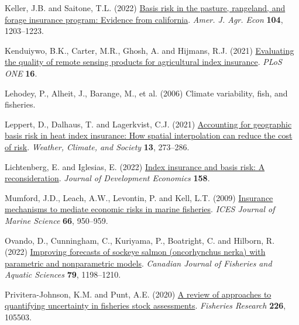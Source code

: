 \documentclass[
  letterpaper,
  DIV=11,
  numbers=noendperiod]{scrartcl}
\newlength{\cslhangindent}
\newlength{\cslentryspacingunit} %
\newenvironment{CSLReferences}[2] %
 {%
  \setlength{\parindent}{0pt}
  \ifodd #1
  \let\oldpar\par
  \def\par{\hangindent=\cslhangindent\oldpar}
  \fi
  \setlength{\parskip}{#2\cslentryspacingunit}
 }%
 {}
\begin{document}
\begin{CSLReferences}{1}{0}
\leavevmode{}%
Keller, J.B. and Saitone, T.L. (2022)
\href{https://doi.org/10.1111/ajae.12282}{Basis risk in the pasture,
rangeland, and forage insurance program: Evidence from california}.
\emph{Amer. J. Agr. Econ} \textbf{104}, 1203--1223.

\leavevmode{}%
Kenduiywo, B.K., Carter, M.R., Ghosh, A. and Hijmans, R.J. (2021)
\href{https://doi.org/10.1371/journal.pone.0258215}{Evaluating the
quality of remote sensing products for agricultural index insurance}.
\emph{PLoS ONE} \textbf{16}.

\leavevmode{}%
Lehodey, P., Alheit, J., Barange, M., et al. (2006) Climate variability,
fish, and fisheries.

\leavevmode{}%
Leppert, D., Dalhaus, T. and Lagerkvist, C.J. (2021)
\href{https://doi.org/10.1175/WCAS-D-20-0070.1}{Accounting for
geographic basis risk in heat index insurance: How spatial interpolation
can reduce the cost of risk}. \emph{Weather, Climate, and Society}
\textbf{13}, 273--286.

\leavevmode{}%
Lichtenberg, E. and Iglesias, E. (2022)
\href{https://doi.org/10.1016/j.jdeveco.2022.102883}{Index insurance and
basis risk: A reconsideration}. \emph{Journal of Development Economics}
\textbf{158}.

\leavevmode{}%
Mumford, J.D., Leach, A.W., Levontin, P. and Kell, L.T. (2009)
\href{https://doi.org/10.1093/icesjms/fsp100}{Insurance mechanisms to
mediate economic risks in marine fisheries}. \emph{ICES Journal of
Marine Science} \textbf{66}, 950--959.

\leavevmode{}%
Ovando, D., Cunningham, C., Kuriyama, P., Boatright, C. and Hilborn, R.
(2022) \href{https://doi.org/10.1139/cjfas-2021-0287}{Improving
forecasts of sockeye salmon (oncorhynchus nerka) with parametric and
nonparametric models}. \emph{Canadian Journal of Fisheries and Aquatic
Sciences} \textbf{79}, 1198--1210.

\leavevmode{}%
Privitera-Johnson, K.M. and Punt, A.E. (2020)
\href{https://doi.org/10.1016/j.fishres.2020.105503}{A review of
approaches to quantifying uncertainty in fisheries stock assessments}.
\emph{Fisheries Research} \textbf{226}, 105503.


\end{CSLReferences}
\end{document}

